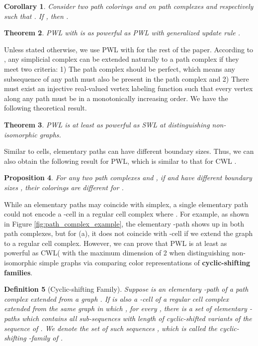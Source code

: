 \documentclass[letterpaper]{article} \usepackage{aaai24}  \usepackage{times}  \usepackage{helvet}  \usepackage{courier}  \usepackage[hyphens]{url}  \usepackage{graphicx} \urlstyle{rm} \def\UrlFont{\rm}  \usepackage{natbib}  \usepackage{caption} \frenchspacing  \setlength{\pdfpagewidth}{8.5in} \setlength{\pdfpageheight}{11in} \usepackage{algorithm}
\newtheorem{definition}{Definition}
\newtheorem{proposition}[definition]{Proposition}
\newtheorem{corollary}[definition]{Corollary}
\newtheorem{theorem}[definition]{Theorem}
\begin{document}
\begin{corollary}
    Consider two path colorings  and  on path complexes  and  respectively such that . If ,  then .
\end{corollary}

\begin{theorem} \label{theorem:color refinement}
    PWL with  is as powerful as PWL with generalized update rule .
\end{theorem}

Unless stated otherwise, we use PWL with  for the rest of the paper. According to \cite{grigoryan_homologies_2013, grigoryan_path_2020}, any simplicial complex can be extended naturally to a path complex if they meet two criteria: 1) The path complex should be perfect, which means any subsequence of any path must also be present in the path complex and 2) There must exist an injective real-valued vertex labeling function such that every vertex along any path must be in a monotonically increasing order. We have the following theoretical result.

\begin{theorem} \label{theorem:pwl_swl}
    PWL is at least as powerful as SWL at distinguishing non-isomorphic graphs.
\end{theorem}

Similar to cells, elementary paths can have different boundary sizes. Thus, we can also obtain the following result for PWL, which is similar to that for CWL \cite{bodnar_weisfeiler_2022}.

\begin{proposition}\label{proposition:boundary size}
    For any two path complexes  and ,  if  and  have different boundary sizes , their colorings are different  for .
\end{proposition}

While an elementary paths may coincide with simplex, a single elementary path could not encode a -cell in a regular cell complex where . For example, as shown in Figure \ref{fig:path_complex_example}, the elementary -path  shows up in both path complexes, but for (a), it does not coincide with -cell if we extend the graph to a regular cell complex. However, we can prove that PWL is at least as powerful as CWL( with the maximum dimension of 2 when distinguishing non-isomorphic simple graphs via comparing color representations of \textbf{cyclic-shifting families}.

\begin{definition}[Cyclic-shifting Family]
    Suppose  is an elementary -path of a path complex extended from a graph . If  is also a -cell of a regular cell complex extended from the same graph in which , for every , there is a set of elementary -paths which contains all sub-sequences with length  of cyclic-shifted variants of the sequence of . We denote the set of such sequences , which is called the cyclic-shifting -family of .
\end{definition}
\end{document}
